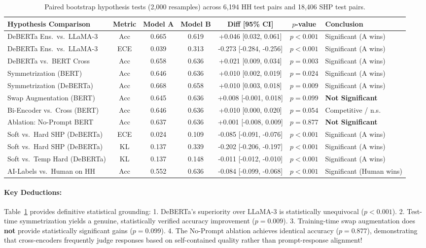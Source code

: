 \documentclass[12pt,a4paper]{article}
\begin{document}
\begin{table}[H]
\centering
\small
\renewcommand{\arraystretch}{1.15}
\begin{tabularx}{\textwidth}{lcccccX}
\toprule
\textbf{Hypothesis Comparison} & \textbf{Metric} & \textbf{Model A} & \textbf{Model B} & \textbf{Diff [95\% CI]} & \textbf{$p$-value} & \textbf{Conclusion} \\
\midrule
DeBERTa Ens.\ vs.\ LLaMA-3 & Acc & 0.665 & 0.619 & +0.046 [0.032, 0.061] & $p < 0.001$ & Significant (A wins) \\
DeBERTa Ens.\ vs.\ LLaMA-3 & ECE & 0.039 & 0.313 & -0.273 [-0.284, -0.256] & $p < 0.001$ & Significant (A wins) \\
DeBERTa vs.\ BERT Cross & Acc & 0.658 & 0.636 & +0.021 [0.009, 0.034] & $p = 0.003$ & Significant (A wins) \\
Symmetrization (BERT) & Acc & 0.646 & 0.636 & +0.010 [0.002, 0.019] & $p = 0.024$ & Significant (A wins) \\
Symmetrization (DeBERTa) & Acc & 0.668 & 0.658 & +0.010 [0.003, 0.018] & $p = 0.009$ & Significant (A wins) \\
Swap Augmentation (BERT) & Acc & 0.645 & 0.636 & +0.008 [-0.001, 0.018] & $p = 0.099$ & \textbf{Not Significant} \\
Bi-Encoder vs.\ Cross (BERT) & Acc & 0.646 & 0.636 & +0.010 [0.000, 0.020] & $p = 0.054$ & Competitive / n.s. \\
Ablation: No-Prompt BERT & Acc & 0.637 & 0.636 & +0.001 [-0.008, 0.009] & $p = 0.877$ & \textbf{Not Significant} \\
\midrule
Soft vs.\ Hard SHP (DeBERTa) & ECE & 0.024 & 0.109 & -0.085 [-0.091, -0.076] & $p < 0.001$ & Significant (A wins) \\
Soft vs.\ Hard SHP (DeBERTa) & KL & 0.137 & 0.339 & -0.202 [-0.206, -0.197] & $p < 0.001$ & Significant (A wins) \\
Soft vs.\ Temp Hard (DeBERTa) & KL & 0.137 & 0.148 & -0.011 [-0.012, -0.010] & $p < 0.001$ & Significant (A wins) \\
\midrule
AI-Labels vs.\ Human on HH & Acc & 0.552 & 0.636 & -0.084 [-0.099, -0.068] & $p < 0.001$ & Significant (Human wins) \\
\bottomrule
\end{tabularx}
\caption{Paired bootstrap hypothesis tests (2,000 resamples) across 6,194 HH test pairs and 18,406 SHP test pairs.}
\label{tab:significance}
\end{table}

\paragraph{Key Deductions:}
Table~\ref{tab:significance} provides definitive statistical grounding:
1. DeBERTa's superiority over LLaMA-3 is statistically unequivocal ($p < 0.001$).
2. Test-time symmetrization yields a genuine, statistically verified accuracy improvement ($p = 0.009$).
3. Training-time swap augmentation does \textbf{not} provide statistically significant gains ($p = 0.099$).
4. The No-Prompt ablation achieves identical accuracy ($p = 0.877$), demonstrating that cross-encoders frequently judge responses based on self-contained quality rather than prompt-response alignment!
\end{document}
